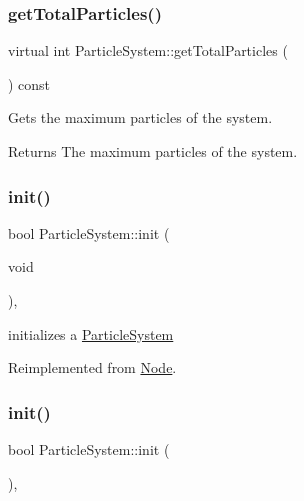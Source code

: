 \subsubsection{\texorpdfstring{get\+Total\+Particles()}{getTotalParticles()}\hspace{0.1cm}{\footnotesize\ttfamily [2/2]}}
{\footnotesize\ttfamily virtual int Particle\+System\+::get\+Total\+Particles (\begin{DoxyParamCaption}{ }\end{DoxyParamCaption}) const\hspace{0.3cm}{\ttfamily [virtual]}}

Gets the maximum particles of the system.

\begin{DoxyReturn}{Returns}
The maximum particles of the system. 
\end{DoxyReturn}
\mbox{\label{classParticleSystem_a65c05b30432f6e8aeb45ba018f3a8d3f}} 
\subsubsection{\texorpdfstring{init()}{init()}\hspace{0.1cm}{\footnotesize\ttfamily [1/2]}}
{\footnotesize\ttfamily bool Particle\+System\+::init (\begin{DoxyParamCaption}\item[{void}]{ }\end{DoxyParamCaption})\hspace{0.3cm}{\ttfamily [override]}, {\ttfamily [virtual]}}

initializes a \hyperlink{classParticleSystem}{Particle\+System} 

Reimplemented from \hyperlink{classNode}{Node}.

\mbox{\label{classParticleSystem_a65c05b30432f6e8aeb45ba018f3a8d3f}} 
\subsubsection{\texorpdfstring{init()}{init()}\hspace{0.1cm}{\footnotesize\ttfamily [2/2]}}
{\footnotesize\ttfamily bool Particle\+System\+::init (\begin{DoxyParamCaption}{ }\end{DoxyParamCaption})\hspace{0.3cm}{\ttfamily [override]}, {\ttfamily [virtual]}}

